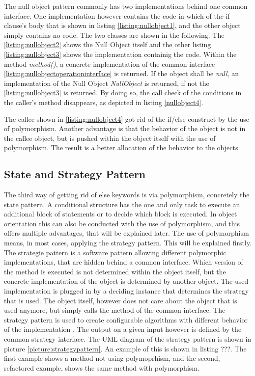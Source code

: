 The null object pattern commonly has two implementations behind one common interface. One implementation however contains the code in which of the if clause's body that is shown in listing \ref{listing:nullobject1}, and the other object simply contains no code. The two classes are shown in the following. The \ref{listing:nullobject2} shows the Null Object itself and the other listing \ref{listing:nullobject3} shows the implementation containig the code. Within the method \textit{method()}, a concrete implementation of the common interface \ref{listing:nullobjectoperationinterface} is returned. If the object shall be \textit{null}, an implementation of the Null Object \textit{NullObject} is returned, if not the \ref{listing:nullobject3} is returned. By doing so, the call check of the conditions in the caller's method disappears, as depicted in listing \ref{nullobject4}.

The callee shown in \ref{listing:nullobject4} got rid of the if/else construct by the use of polymorphism. Another advantage is that the behavior of the object is not in the callee object, but is pushed within the object itself with the use of polymorphism. The result is a better allocation of the behavior to the objects.
\\

\subsection*{State and Strategy Pattern}
The third way of getting rid of else keywords is via polymorphism, concretely the state pattern. A conditional structure has the one and only task to execute an additional block of statements or to decide which block is executed. In object orientation this can also be conducted with the use of polymorphism, and this offers multiple advantages, that will be explained later. 
The use of polymorphism means, in most cases, applying the strategy pattern. This will be explained firstly. 
\\

The strategie pattern is a software pattern allowing different polymorphic implementations, that are hidden behind a common interface. Which version of the method is executed is not determined within the object itself, but the concrete implementation of the object is determined by another object. The used implementation is plugged in by a deciding instance that determines the strategy that is used. The object itself, however does not care about the object that is used anymore, but simply calls the method of the common interface. The strategy pattern is used to create configurable algorithms with different behavior of the implementation \cite[p. 349]{gof}. The output on a given input however is defined by the common strategy interface. The \ac{UML} diagram of the strategy pattern is shown in picture \ref{picture:strategypattern}. An example of this is shown in listing ???. The first example shows a method not using polymoprhism, and the second, refactored example, shows the same method with polymorphism.

